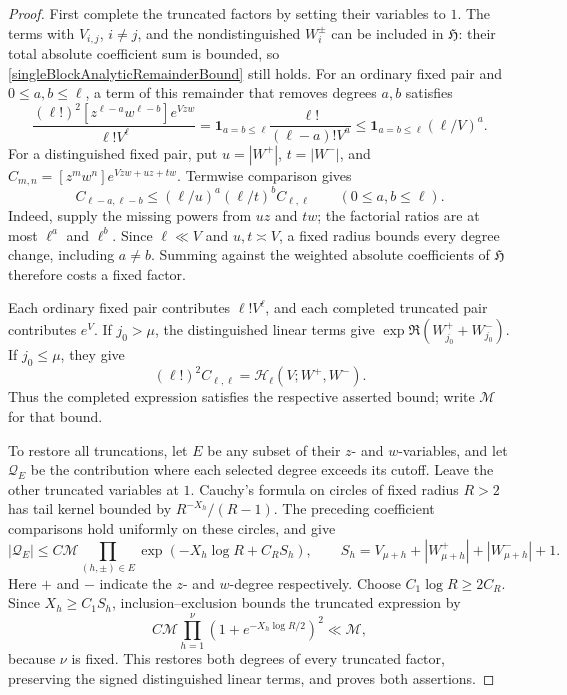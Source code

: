 \documentclass[oneside, 12pt]{amsart}
\theoremstyle{definition}
\begin{document}
\begin{proof}
{			First complete the truncated factors by setting their variables to $1$.
			The terms with $V_{i,j}$, $i\ne j$, and the nondistinguished $W_i^\pm$
			can be included in $\mathfrak H$: their total absolute coefficient sum
			is bounded, so \eqref{singleBlockAnalyticRemainderBound} still holds.
			For an ordinary fixed pair and $0\leq a,b\leq\ell$, a term of this
			remainder that removes degrees $a,b$ satisfies
			\begin{equation}\label{ordinaryFixedCoefficientShift}
				\frac{(\ell!)^2[z^{\ell-a}w^{\ell-b}]e^{Vzw}}{\ell!V^\ell}
				=\mathbf1_{a=b\leq\ell}\frac{\ell!}{(\ell-a)!V^a}
				\leq\mathbf1_{a=b\leq\ell}(\ell/V)^a.
			\end{equation}
			For a distinguished fixed pair, put $u=|W^+|$, $t=|W^-|$, and
			$C_{m,n}=[z^mw^n]e^{Vzw+uz+tw}$. Termwise comparison gives
			\begin{equation}\label{distinguishedFixedCoefficientShift}
				C_{\ell-a,\ell-b}
				\leq(\ell/u)^a(\ell/t)^b C_{\ell,\ell}
				\qquad(0\leq a,b\leq\ell).
			\end{equation}
			Indeed, supply the missing powers from $uz$ and $tw$; the factorial
			ratios are at most $\ell^a$ and $\ell^b$. Since $\ell\ll V$ and
			$u,t\asymp V$, a fixed radius bounds every degree change, including
			$a\ne b$. Summing against the weighted absolute coefficients of
			$\mathfrak H$ therefore costs a fixed factor.
			
			Each ordinary fixed pair contributes $\ell!V^\ell$, and each
			completed truncated pair contributes $e^V$. If $j_0>\mu$, the
			distinguished linear terms give
			$\exp\Re(W_{j_0}^++W_{j_0}^-)$. If $j_0\leq\mu$, they give
			\[
			(\ell!)^2C_{\ell,\ell}=\mathcal H_\ell(V;W^+,W^-).
			\]
			Thus the completed expression satisfies the respective asserted bound;
			write $\mathcal M$ for that bound.
			
			To restore all truncations, let $E$ be any subset of their $z$- and
			$w$-variables, and let $\mathcal Q_E$ be the contribution where each
			selected degree exceeds its cutoff. Leave the other truncated variables
			at $1$. Cauchy's formula on circles of fixed radius $R>2$ has tail
			kernel bounded by $R^{-X_h}/(R-1)$. The preceding coefficient
			comparisons hold uniformly on these circles, and give
			\[
			|\mathcal Q_E|\leq C\mathcal M
			\prod_{(h,\pm)\in E}\exp(-X_h\log R+C_RS_h),\qquad
			S_h=V_{\mu+h}+|W_{\mu+h}^+|+|W_{\mu+h}^-|+1.
			\]
			Here $+$ and $-$ indicate the $z$- and $w$-degree respectively.
			Choose $C_1\log R\geq2C_R$. Since $X_h\geq C_1S_h$,
			inclusion--exclusion bounds the truncated expression by
			\[
			C\mathcal M\prod_{h=1}^{\nu}(1+e^{-X_h\log R/2})^2
			\ll\mathcal M,
			\]
			because $\nu$ is fixed. This restores both degrees of every truncated
			factor, preserving the signed distinguished linear terms, and proves
			both assertions.
		}
	\end{proof}
	
\end{document}
